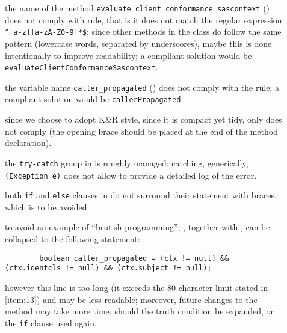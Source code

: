 \begin{description}
	
	\item []
		the name of the method \verb|evaluate_client_conformance_sascontext| () does not comply with rule, that is it does not match the regular expression \verb|^[a-z][a-zA-Z0-9]*$|; since other methods in the class do follow the same pattern (lowercase words, separated by underscores), maybe this is done intentionally to improve readability; a compliant solution would be: \texttt{evaluateClientConformanceSascontext}. %
	
	\item []
		the variable name \verb|caller_propagated| () does not comply with the rule; a compliant solution would be \verb|callerPropagated|. 
	
	\item []
		since we choose to adopt K\&R style, since it is compact yet tidy, only  does not comply (the opening brace should be placed at the end of the method declaration).
		
\end{description}




\begin{description}
	
	\item []
		the \verb|try-catch| group in  is roughly managed: catching, generically, \verb|(Exception e)| does not allow to provide a detailed log of the error.

\end{description}



\begin{description}
	
	\item [] 
		both \verb|if| and \verb|else| clauses in  do not surround their statement with braces, which is to be avoided.
		
	\item []
		to avoid an example of ``brutish programming'', , together with , can be collapsed to the following statement: 
		\begin{verbatim}
		boolean caller_propagated = (ctx != null) && (ctx.identcls != null) && (ctx.subject != null);
		\end{verbatim}
		however this line is too long (it exceeds the 80 character limit stated in \cref{item:13}) and may be less readable; moreover, future changes to the method may take more time, should the truth condition be expanded, or the \verb|if| clause used again.

\end{description}

